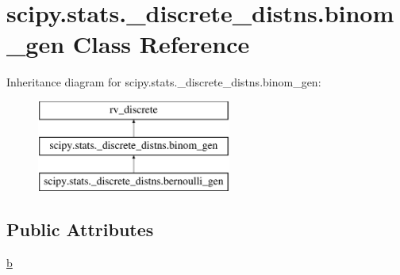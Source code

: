\hypertarget{classscipy_1_1stats_1_1__discrete__distns_1_1binom__gen}{}\section{scipy.\+stats.\+\_\+discrete\+\_\+distns.\+binom\+\_\+gen Class Reference}
\label{classscipy_1_1stats_1_1__discrete__distns_1_1binom__gen}
Inheritance diagram for scipy.\+stats.\+\_\+discrete\+\_\+distns.\+binom\+\_\+gen\+:\begin{figure}[H]
\begin{center}
\leavevmode
\includegraphics[height=3.000000cm]{classscipy_1_1stats_1_1__discrete__distns_1_1binom__gen}
\end{center}
\end{figure}
\subsection*{Public Attributes}
\begin{DoxyCompactItemize}
\item 
\hyperlink{classscipy_1_1stats_1_1__discrete__distns_1_1binom__gen_a596447f5ba700e6b81d04f0049aa98e7}{b}
\end{DoxyCompactItemize}


